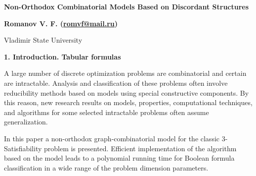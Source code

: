 \documentclass[12pt, a4paper]{article}
\begin{document}
\thispagestyle{empty}
\begin{center}
{\bf Non-Orthodox Combinatorial Models Based on Discordant Structures}
\end{center}
\begin{center}
{\bf Romanov V. F. (\href{mailto:romvf@mail.ru}{romvf@mail.ru})}
\end{center}
\begin{center}
Vladimir State University
\end{center}

\begin{abstract}
This paper introduces a novel method for compact
representation of sets of
$n$-dimensional binary sequences in a form of compact triplets  structures (CTS), supposing both logic and arithmetic interpretations of data. Suitable illustration of CTS application is the unique graph-combinatorial model for the classic intractable 3-Satisfiability problem and a polynomial algorithm for the model synthesis. The method used for Boolean formulas analysis and classification by means of the model is defined as {\it a bijective mapping principle for sets of components of discordant structures to a basic set.} The statistic computer-aided experiment showed efficiency of the algorithm in a large scale of problem dimension parameters, including those that make enumeration procedures of no use.

The formulated principle expands resources of constructive approach to investigation of intractable problems.

\medskip
{\bf Index Terms---}Structure of compact triplets, discordant structures, structures unification, joint satisfying set, hyperstructure, systemic effective procedure.
\end{abstract}

\textbf{1. Introduction. Tabular formulas}

A large number of discrete optimization problems are combinatorial and certain are intractable. Analysis and classification of these problems often involve reducibility methods based on models using special constructive components. By this reason, new research results on models, properties, computational techniques, and algorithms for some selected intractable problems often assume generalization.

In this paper a non-orthodox graph-combinatorial model for the classic 3-Satisfiability problem is presented. Efficient implementation of the algorithm based on the model leads to a polynomial running time for Boolean formula classification in a wide range of the problem dimension parameters.
\end{document}
